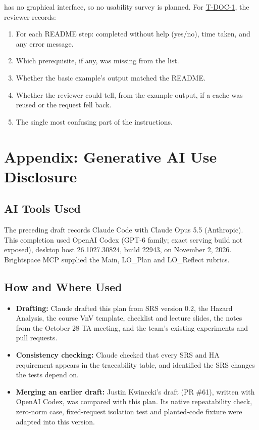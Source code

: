 \documentclass[12pt, titlepage]{article}
\newcommand{\tref}[1]{\hyperref[test:#1]{#1}}
\begin{document}
\progname{} has no graphical interface, so no usability survey is planned.
For \tref{T-DOC-1}, the reviewer records:
\begin{enumerate}
  \item For each README step: completed without help (yes/no), time taken,
  and any error message.
  \item Which prerequisite, if any, was missing from the list.
  \item Whether the basic example's output matched the README.
  \item Whether the reviewer could tell, from the example output, if a
  cache was reused or the request fell back.
  \item The single most confusing part of the instructions.
\end{enumerate}

\newpage

\section{Appendix: Generative AI Use Disclosure}

\subsection{AI Tools Used}

The preceding draft records Claude Code with Claude Opus 5.5 (Anthropic).
This completion used OpenAI Codex (GPT-6 family; exact serving build not
exposed), desktop host 26.1027.30824, build 22943, on November 2, 2026.
Brightspace MCP supplied the Main, LO\_Plan and LO\_Reflect rubrics.

\subsection{How and Where Used}

\begin{itemize}
  \item \textbf{Drafting:} Claude drafted this plan from SRS version 0.2,
  the Hazard Analysis, the course VnV template, checklist and lecture
  slides, the notes from the October 28 TA meeting, and the team's existing
  experiments and pull requests.
  \item \textbf{Consistency checking:} Claude checked that every SRS and HA
  requirement appears in the traceability table, and identified the SRS
  changes the tests depend on.
  \item \textbf{Merging an earlier draft:} Justin Kwinecki's draft (PR
  \#61), written with OpenAI Codex, was compared with this plan. Its native
  repeatability check, zero-norm case, fixed-request isolation test and
  planted-code fixture were adapted into this version.
\end{itemize}
\end{document}

